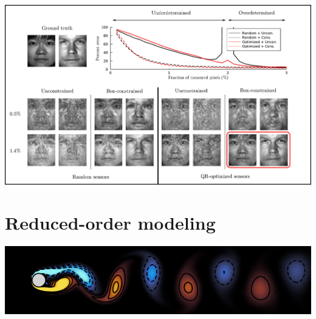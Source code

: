 \documentclass[aspectratio=169, usenames, dvipsnames]{beamer}
\begin{document}
{

\begin{frame}
  \vfill
  \centering

  \includegraphics[width=\textwidth]{eigenfaces_error_plot}

  \vfill
\end{frame}
}


\section{Reduced-order modeling}
\begin{frame}
  \sectionpage
\end{frame}

\begin{frame}
  \centering
  \vfill
  \includegraphics[width=\textwidth]{dns_snapshot}
  \vfill
\end{frame}
\end{document}
